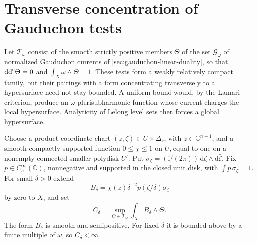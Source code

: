 \section{Transverse concentration of Gauduchon tests}
\label{sec:gauduchon-transverse-concentration}

Let $\mathcal T_\omega$ consist of the smooth strictly positive members $\Theta$ of the set $\mathscr G_\omega$ of normalized Gauduchon currents of \cref{sec:gauduchon-linear-duality}, so that $\mathrm{dd}^{\mathrm{c}}\Theta=0$ and $\int_X\omega\wedge\Theta=1$.
These tests form a weakly relatively compact family, but their pairings with a form concentrating transversely to a hypersurface need not stay bounded. A uniform bound would, by the Lamari criterion, produce an $\omega$-plurisubharmonic function whose current charges the local hypersurface. Analyticity of Lelong level sets then forces a global hypersurface.

Choose a product coordinate chart $(z,\zeta)\in U\times\Delta_r$, with $z\in\mathbb C^{n-1}$, and a smooth compactly supported function $0\leq\chi\leq1$ on $U$, equal to one on a nonempty connected smaller polydisk $U'$. Put $\sigma_\zeta=(\mathrm i/(2\pi))\,\mathrm d\zeta\wedge\mathrm d\bar\zeta$. Fix $p\in C_c^\infty(\mathbb C)$, nonnegative and supported in the closed unit disk, with $\int p\,\sigma_\zeta=1$. For small $\delta>0$ extend
\[
 B_\delta=\chi(z)\delta^{-2}p(\zeta/\delta)\sigma_\zeta
\]
by zero to $X$, and set
\[
 C_\delta=\sup_{\Theta\in\mathcal T_\omega}
                      \int_XB_\delta\wedge\Theta.
\]
The form $B_\delta$ is smooth and semipositive. For fixed $\delta$ it is bounded above by a finite multiple of $\omega$, so $C_\delta<\infty$.

